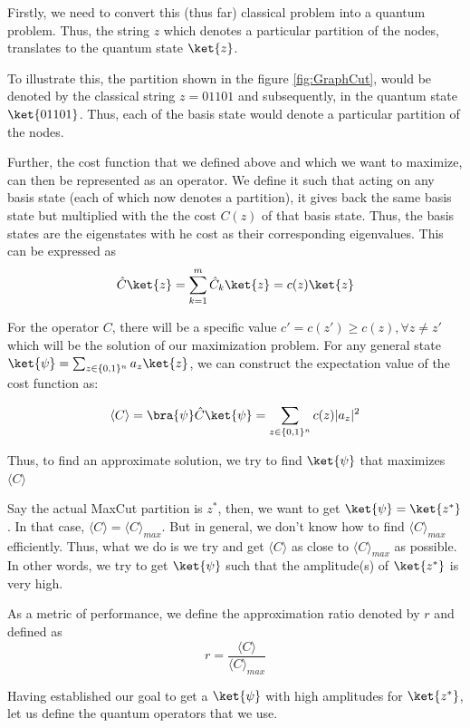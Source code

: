 Firstly, we need to convert this (thus far) classical problem into a quantum problem. Thus, the string $z$ which denotes a particular partition of the nodes, translates to the quantum state $\ket{z}$.

To illustrate this, the partition shown in the figure \ref{fig:GraphCut}, would be denoted by the classical string $z = 01101$ and subsequently, in the quantum state $\ket{01101}$.
Thus, each of the basis state would denote a particular partition of the nodes.

Further, the cost function that we defined above and which we want to maximize, can then be represented as an operator.
We define it such that acting on any basis state (each of which now denotes a partition), it gives back the same basis state but multiplied with the the cost $C(z)$ of that basis state.
Thus, the basis states are the eigenstates with he cost as their corresponding eigenvalues. This can be expressed as
\begin{equation}
    \hat{C}\ket{z}= \sum_{k=1}^m \hat{C}_k\ket{z} = c(z)\ket{z}
    \label{equation:cost_op}
\end{equation}

For the operator $C$, there will be a specific value $c'=c(z')\geq c(z),\forall z\neq z'$ which will be the solution of our maximization problem.
For any general state $\ket{\psi}=\sum_{z \in\{0,1\}^n}a_z\ket{z}$, we can construct the expectation value of the cost function as:

\[
    \left\langle C\right\rangle =\bra{\psi}\hat{C}\ket{\psi} = \sum_{z \in\{0,1\}^n}c(z)|a_z|^2
\]

Thus, to find an approximate solution, we try to find $\ket{\psi}$ that maximizes $\langle C \rangle$

Say the actual MaxCut partition is $z^*$, then, we want to get $\ket{\psi} = \ket{z^*}$.
In that case, $\langle C \rangle = \langle C \rangle_{max}$.
But in general, we don't know how to find $\langle C \rangle_{max}$ efficiently.
Thus, what we do is we try and get $\langle C \rangle$ as close to $\langle C \rangle_{max}$ as possible.
In other words, we try to get $\ket{\psi}$ such that the amplitude(s) of $\ket{z^*}$ is very high.

As a metric of performance, we define the approximation ratio denoted by $r$ and defined as
$$r = \frac{ \langle C \rangle }{\langle C \rangle_{max}} $$


Having established our goal to get a $\ket{\psi}$ with high amplitudes for $\ket{z^*}$, let us define the quantum operators that we use.
